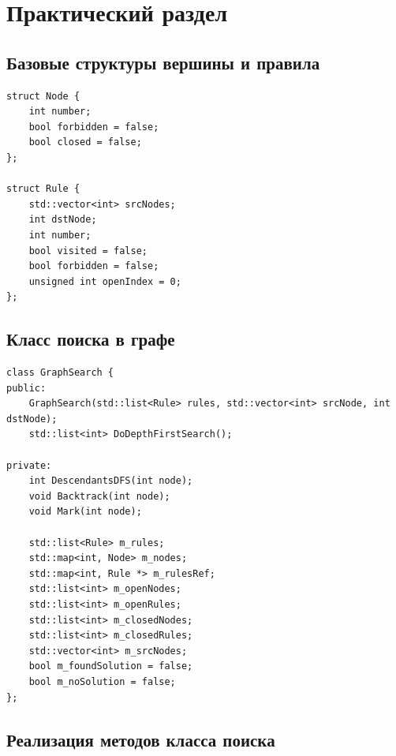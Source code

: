 \chapter{Практический раздел}

\section{Базовые структуры вершины и правила}

\begin{lstlisting}
struct Node {
    int number;
    bool forbidden = false;
    bool closed = false;
};

struct Rule {
    std::vector<int> srcNodes;
    int dstNode;
    int number;
    bool visited = false;
    bool forbidden = false;
    unsigned int openIndex = 0;
};
\end{lstlisting}

\section{Класс поиска в графе}

\begin{lstlisting}
class GraphSearch {
public:
    GraphSearch(std::list<Rule> rules, std::vector<int> srcNode, int dstNode);
    std::list<int> DoDepthFirstSearch();

private:
    int DescendantsDFS(int node);
    void Backtrack(int node);
    void Mark(int node);

    std::list<Rule> m_rules;
    std::map<int, Node> m_nodes;
    std::map<int, Rule *> m_rulesRef;
    std::list<int> m_openNodes;
    std::list<int> m_openRules;
    std::list<int> m_closedNodes;
    std::list<int> m_closedRules;
    std::vector<int> m_srcNodes;
    bool m_foundSolution = false;
    bool m_noSolution = false;
};
\end{lstlisting}

\section{Реализация методов класса поиска}

